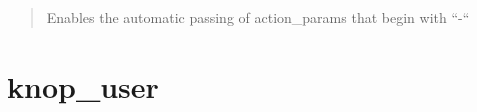 \documentclass[letterpaper,10pt,english]{sphinxmanual}
\begin{document}
\begin{fulllineitems}
\begin{fulllineitems}
\begin{description}
\begin{quote}
Enables the automatic passing of action\_params that begin with ``-``
\end{quote}

\end{description}

\end{fulllineitems}


\begin{fulllineitems}
\label{knop_nav:knop_nav.urlmap}
\end{fulllineitems}



\begin{fulllineitems}
\end{fulllineitems}


\begin{fulllineitems}
\label{knop_nav:knop_nav.urlparams}
\end{fulllineitems}



\begin{fulllineitems}
\end{fulllineitems}


\begin{fulllineitems}
\label{knop_nav:knop_nav.version}
\end{fulllineitems}



\begin{fulllineitems}
\end{fulllineitems}


\end{fulllineitems}



\chapter{knop\_user}
\label{knop_user::doc}\label{knop_user:knop-user}
\end{document}
